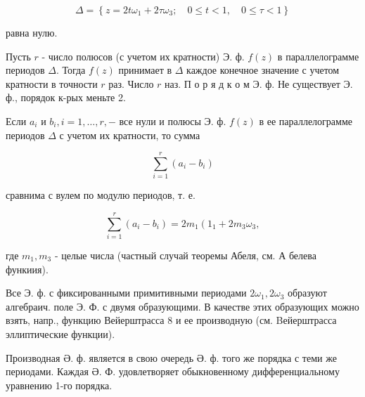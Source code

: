 \documentclass[10pt]{article}
\begin{document}
\[

\Delta=\left\{z=2 t \omega_{1}+2 \tau \omega_{3} ; \quad 0 \leqslant t<1, \quad 0 \leqslant \tau<1\right\}

\]



равна нулю.



Пусть $r$ - число полюсов (с учетом их кратности) Э. ф. $f(z)$ в параллелограмме периодов $\Delta$. Тогда $f(z)$ принимает в $\Delta$ каждое конечное значение с учетом кратности в точности $r$ раз. Число $r$ наз. П о р я д к о м Э. ф. Не существует Э. ф., порядок к-рых меньте 2.



Если $a_{i}$ и $b_{i}, i=1, \ldots, r,-$ все нули и полюсы Э. ф. $f(z)$ в ее параллелограмме периодов $\Delta$ с учетом их кратности, то сумма



\[

\sum_{i=1}^{r}\left(a_{i}-b_{i}\right)

\]



сравнима с вулем по модулю периодов, т. е.



\[

\sum_{i=1}^{r}\left(a_{i}-b_{i}\right)=2 m_{1}\left(1_{1}+2 m_{3} \omega_{3},\right.

\]



где $m_{1}, m_{3}$ - целые числа (частный случай теоремы Абеля, см. А белева функиия).



Все Э. ф. с фиксированными примитивными периодами $2 \omega_{1}, 2 \omega_{3}$ образуют алгебраич. поле Э. Ф. с двумя образующими. В качестве этих образующих можно взять, напр., функцию Вейерштрасса 8 и ее производную (см. Bейерштрасса эллиптические функции).



Производная Ә. ф. является в свою очередь Ә. ф. того же порядка с теми же периодами. Каждая Ә. Ф. удовлетворяет обыкновенному дифференциальному уравнению 1-го порядка.
\end{document}

